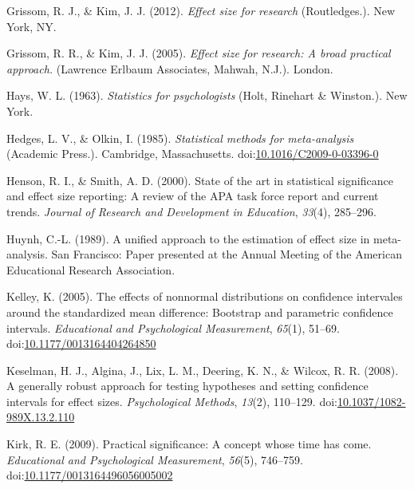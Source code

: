 \documentclass[
  man,floatsintext]{apa6}
\begin{document}
\leavevmode\hypertarget{ref-Grissom_and_Kim_2012}{}%
Grissom, R. J., \& Kim, J. J. (2012). \emph{Effect size for research} (Routledges.). New York, NY.

\leavevmode\hypertarget{ref-Grissom_and_kim_2005}{}%
Grissom, R. R., \& Kim, J. J. (2005). \emph{Effect size for research: A broad practical approach.} (Lawrence Erlbaum Associates, Mahwah, N.J.). London.

\leavevmode\hypertarget{ref-Hays_1963}{}%
Hays, W. L. (1963). \emph{Statistics for psychologists} (Holt, Rinehart \& Winston.). New York.

\leavevmode\hypertarget{ref-Hedges_Olkin_1985}{}%
Hedges, L. V., \& Olkin, I. (1985). \emph{Statistical methods for meta-analysis} (Academic Press.). Cambridge, Massachusetts. doi:\href{https://doi.org/10.1016/C2009-0-03396-0}{10.1016/C2009-0-03396-0}

\leavevmode\hypertarget{ref-Henson_Smith_2000}{}%
Henson, R. I., \& Smith, A. D. (2000). State of the art in statistical significance and effect size reporting: A review of the APA task force report and current trends. \emph{Journal of Research and Development in Education}, \emph{33}(4), 285--296.

\leavevmode\hypertarget{ref-Huynh_1989}{}%
Huynh, C.-L. (1989). A unified approach to the estimation of effect size in meta-analysis. San Francisco: Paper presented at the Annual Meeting of the American Educational Research Association.

\leavevmode\hypertarget{ref-Kelley_2005}{}%
Kelley, K. (2005). The effects of nonnormal distributions on confidence intervales around the standardized mean difference: Bootstrap and parametric confidence intervals. \emph{Educational and Psychological Measurement}, \emph{65}(1), 51--69. doi:\href{https://doi.org/10.1177/0013164404264850}{10.1177/0013164404264850}

\leavevmode\hypertarget{ref-Keselman_et_al_2008}{}%
Keselman, H. J., Algina, J., Lix, L. M., Deering, K. N., \& Wilcox, R. R. (2008). A generally robust approach for testing hypotheses and setting confidence intervals for effect sizes. \emph{Psychological Methods}, \emph{13}(2), 110--129. doi:\href{https://doi.org/10.1037/1082-989X.13.2.110}{10.1037/1082-989X.13.2.110}

\leavevmode\hypertarget{ref-Kirk_2009}{}%
Kirk, R. E. (2009). Practical significance: A concept whose time has come. \emph{Educational and Psychological Measurement}, \emph{56}(5), 746--759. doi:\href{https://doi.org/10.1177/0013164496056005002\%20}{10.1177/0013164496056005002 }
\end{document}
